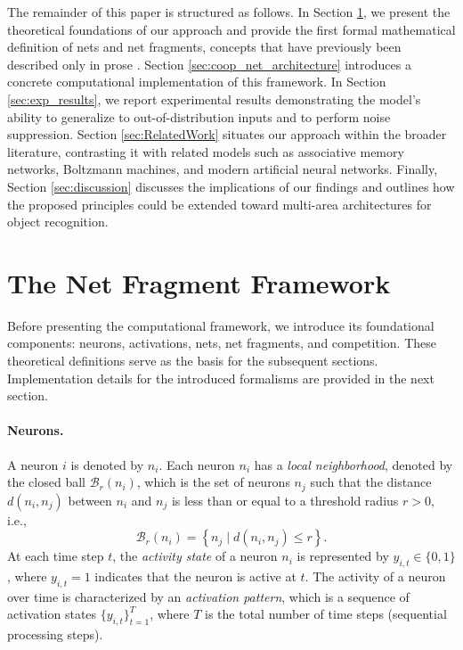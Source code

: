 \documentclass[12pt]{article}
\begin{document}
The remainder of this paper is structured as follows. In Section \ref{sec:fundamentals}, we present the theoretical foundations of our approach and provide the first formal mathematical definition of nets and net fragments, concepts that have previously been described only in prose \citep{von_der_malsburg_concerning_2018, von_der_malsburg_theory_2022}. Section \ref{sec:coop_net_architecture} introduces a concrete computational implementation of this framework. In Section \ref{sec:exp_results}, we report experimental results demonstrating the model’s ability to generalize to out-of-distribution inputs and to perform noise suppression. Section \ref{sec:RelatedWork} situates our approach within the broader literature, contrasting it with related models such as associative memory networks, Boltzmann machines, and modern artificial neural networks. Finally, Section \ref{sec:discussion} discusses the implications of our findings and outlines how the proposed principles could be extended toward multi-area architectures for object recognition.

\section{The Net Fragment Framework}
\label{sec:fundamentals}
Before presenting the computational framework, we introduce its foundational components: neurons, activations, nets, net fragments, and competition. These theoretical definitions serve as the basis for the subsequent sections. Implementation details for the introduced formalisms are provided in the next section.


\paragraph{Neurons.}
A neuron $i$ is denoted by $n_i$. Each neuron $n_i$ has a \emph{local neighborhood}, denoted by the closed ball $\mathcal{B}_r(n_i)$, which is the set of neurons $n_j$ such that the distance $d(n_i, n_j)$ between $n_i$ and $n_j$ is less than or equal to a threshold radius $r>0$, i.e.,
%
\begin{equation}
\mathcal{B}_r\left(n_i\right) = \left \{n_j \mid d(n_i, n_j) \leq r \right \}.
\label{eq:neighborhood}
\end{equation}
%
At each time step $t$, the \emph{activity state} of a neuron $n_i$ is represented by $y_{i,t} \in \{0, 1\}$, where $y_{i,t} = 1$ indicates that the neuron is active at $t$. The activity of a neuron over time is characterized by an \emph{activation pattern}, which is a sequence of activation states $\{y_{i,t}\}_{t=1}^T$, where $T$ is the total number of time steps (sequential processing steps).
\end{document}
